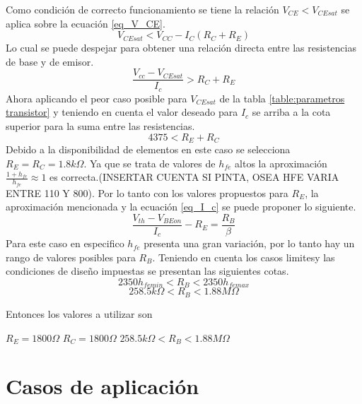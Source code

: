 Como condición de correcto funcionamiento se tiene la relación $V_{CE} < V_{CEsat}$ se aplica sobre la ecuación \ref{eq_V_CE}.
\begin{equation}
    V_{CEsat}<V_{CC}-I_C(R_C+R_E)
    \label{eq_V_CEsat}
\end{equation}
Lo cual se puede despejar para obtener una relación directa entre las resistencias de base y de emisor.
\begin{equation}
    \frac{V_{cc} -V_{CEsat}}{I_c} > R_C + R_E
    \label{eq_cota_sup_RC_RE}
\end{equation}
Ahora aplicando el peor caso posible para $V_{CEsat}$ de la tabla \ref{table:parametros transistor} y teniendo en cuenta el valor deseado para $I_c$ se arriba a la cota superior para la suma entre las resistencias.
\begin{equation}
    4375< R_E + R_C
    \label{cota_numerica}
\end{equation}
Debido a la disponibilidad de elementos en este caso se selecciona $R_E = R_C = 1.8k\Omega$.
Ya que se trata de valores de $h_{fe}$ altos la aproximación $\frac{1+h_{fe}}{h_{fe}}\approx 1$ es correcta.(INSERTAR CUENTA SI PINTA, OSEA HFE VARIA ENTRE 110 Y 800). Por lo tanto con los valores propuestos para $R_E$, la aproximación mencionada y la ecuación \ref{eq_I_c} se puede proponer lo siguiente.
\begin{equation}
    \frac{V_{th} - V_{BEon}}{I_c} - R_E = \frac{R_B}{\beta}
    \label{eq_relacion_R_B}
\end{equation}
Para este caso en especifico $h_{fe}$ presenta una gran variación, por lo tanto hay un rango de valores posibles para $R_B$. Teniendo en cuenta los casos limitesy las condiciones de diseño impuestas se presentan las siguientes cotas.
\begin{equation}
    2350 h_{fe min} < R_B < 2350 h_{fe max}
\end{equation}
\begin{equation}
    258.5k\Omega < R_B < 1.88M\Omega
\end{equation}

Entonces los valores a utilizar son
\begin{center}
    $R_E = 1800\Omega$  $R_C = 1800\Omega$ $258.5k\Omega < R_B < 1.88M\Omega$
\end{center}

\section{Casos de aplicación}

